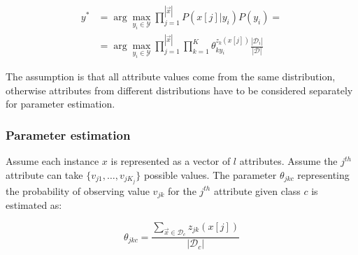 		\begin{align*}
			y^* &=\arg\max\limits_{y_i\in\mathcal{Y}}\prod\limits_{j=1}^{|\vec{x}|}P(x[j]|y_i)P(y_i) =\\
					&=\arg\max\limits_{y_i\in\mathcal{Y}}\prod\limits_{j=1}^{|\vec{x}|}\prod\limits_{k=1}^K\theta_{ky_i}^{z_k(x[j])}\frac{|\mathcal{D}_i|}{|\mathcal{D}|}
		\end{align*}

		The assumption is that all attribute values come from the same distribution, otherwise attributes from different distributions have to be considered separately for parameter estimation.

		\subsubsection{Parameter estimation}
		Assume each instance $x$ is represented as a vector of $l$ attributes.
		Assume the $j^{th}$ attribute can take $\{v_{j1}, \dots, v_{jK_j}\}$ possible values.
		The parameter $\theta_{jkc}$ representing the probability of observing value $v_{jk}$ for the $j^{th}$ attribute given class $c$ is estimated as:

		$$\theta_{jkc} = \frac{\sum\limits_{\vec{x}\in\mathcal{D}_c}z_{jk}(x[j])}{|\mathcal{D}_c|}$$
